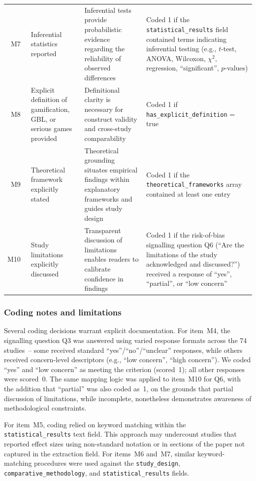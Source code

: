 \documentclass[etq]{acnsart}
\begin{document}
\begin{table}[!ht]
{\begin{tabularx}{1.005\linewidth}{@{}c  p{} X p{}@{}}
				\addlinespace
				M7 & Inferential statistics reported & Inferential tests provide probabilistic evidence regarding the reliability of observed differences & Coded 1 if the \texttt{statistical\_results} field contained terms indicating inferential testing (e.g., $t$-test, ANOVA, Wilcoxon, $\chi^2$, regression, ``significant'', $p$-values) \\
				\addlinespace
				M8 & Explicit definition of gamification, GBL, or serious games provided & Definitional clarity is necessary for construct validity and cross-study comparability & Coded 1 if \texttt{has\_explicit\_definition} = true \\
				\addlinespace
				M9 & Theoretical framework explicitly stated & Theoretical grounding situates empirical findings within explanatory frameworks and guides study design & Coded 1 if the \texttt{theoretical\_frameworks} array contained at least one entry \\
				\addlinespace
				M10~ & Study limitations explicitly discussed & Transparent discussion of limitations enables readers to calibrate confidence in findings & Coded 1 if the risk-of-bias signalling question Q6 (``Are the limitations of the study acknowledged and discussed?'') received a response of ``yes'', ``partial'', or ``low concern'' \\
				\bottomrule
			\end{tabularx}
		}
	\end{table}
	
	\subsubsection{Coding notes and limitations}
	
	Several coding decisions warrant explicit documentation. For item~M4, the signalling question Q3 was answered using varied response formats across the 74 studies~-- some received standard ``yes''/``no''/``unclear'' responses, while others received concern-level descriptors (e.g., ``low concern'', ``high concern''). We coded ``yes'' and ``low concern'' as meeting the criterion (scored~1); all other responses were scored~0. The same mapping logic was applied to item~M10 for Q6, with the addition that ``partial'' was also coded as~1, on the grounds that partial discussion of limitations, while incomplete, nonetheless demonstrates awareness of methodological constraints.
	
	For item~M5, coding relied on keyword matching within the \texttt{statistical\_results} text field. This approach may undercount studies that reported effect sizes using non-standard notation or in sections of the paper not captured in the extraction field. For items~M6 and~M7, similar keyword-matching procedures were used against the \texttt{study\_design}, \texttt{comparative\_methodology}, and \texttt{statistical\_results} fields.
	
\end{document}
